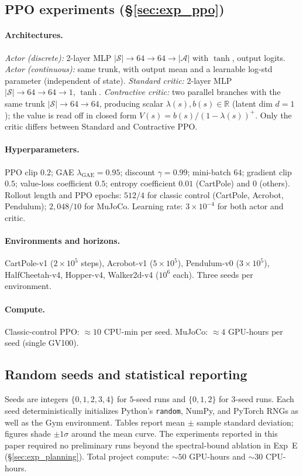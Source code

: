 \documentclass{article}
\newcommand{\R}{\mathbb{R}}
\newcommand{\eigs}{\lambda}                  %
\begin{document}
\subsection{PPO experiments (\S\ref{sec:exp_ppo})}
\label{app:ppo}

\paragraph{Architectures.}
\emph{Actor (discrete):} 2-layer MLP $|\mathcal{S}|\!\to\!64\!\to\!64\!\to\!|\mathcal{A}|$
with $\tanh$, output logits.
\emph{Actor (continuous):} same trunk, with output mean and a learnable
log-std parameter (independent of state).
\emph{Standard critic:} 2-layer MLP $|\mathcal{S}|\!\to\!64\!\to\!64\!\to\!1$, $\tanh$.
\emph{Contractive critic:} two parallel branches with the same trunk
$|\mathcal{S}|\!\to\!64\!\to\!64$, producing scalar $\eigs(s), b(s) \in \R$
(latent dim $d = 1$); the value is read off in closed form
$V(s) = b(s) / (1-\eigs(s))^+$.
Only the critic differs between Standard and Contractive PPO.

\paragraph{Hyperparameters.}
PPO clip $0.2$; GAE $\lambda_\text{GAE} = 0.95$; discount $\gamma = 0.99$;
mini-batch $64$; gradient clip $0.5$; value-loss coefficient $0.5$;
entropy coefficient $0.01$ (CartPole) and $0$ (others).
Rollout length and PPO epochs: $512 / 4$ for classic control (CartPole,
Acrobot, Pendulum); $2{,}048 / 10$ for MuJoCo.
Learning rate: $3 \times 10^{-4}$ for both actor and critic.

\paragraph{Environments and horizons.}
CartPole-v1 ($2\!\times\!10^5$ steps), Acrobot-v1 ($5\!\times\!10^5$),
Pendulum-v0 ($3\!\times\!10^5$), HalfCheetah-v4, Hopper-v4, Walker2d-v4
($10^6$ each).
Three seeds per environment.

\paragraph{Compute.}
Classic-control PPO: $\approx 10$ CPU-min per seed.
MuJoCo: $\approx 4$ GPU-hours per seed (single GV100).

\subsection{Random seeds and statistical reporting}
\label{app:seeds}
Seeds are integers $\{0, 1, 2, 3, 4\}$ for $5$-seed runs and $\{0, 1, 2\}$ for
$3$-seed runs.
Each seed deterministically initializes Python's \texttt{random}, NumPy, and
PyTorch RNGs as well as the Gym environment.
Tables report mean $\pm$ sample standard deviation; figures shade
$\pm 1\sigma$ around the mean curve.
The experiments reported in this paper required no preliminary runs beyond the
spectral-bound ablation in Exp~E (\S\ref{sec:exp_planning}).
Total project compute: $\sim 50$ GPU-hours and $\sim 30$ CPU-hours.
\end{document}
